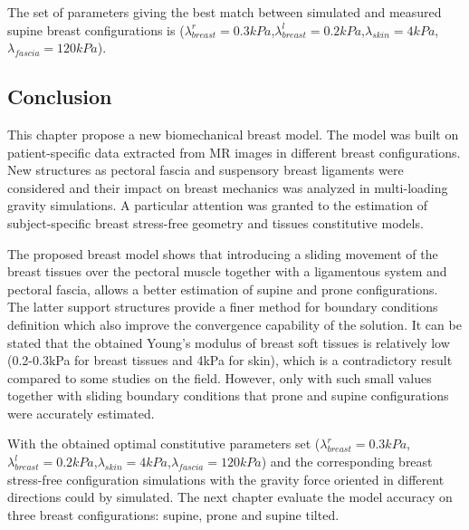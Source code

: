 The set of parameters giving the best match between simulated and measured supine breast configurations is ($\lambda_{breast}^r=0.3 kPa$,$\lambda_{breast}^l=0.2 kPa$,$\lambda_{skin}=4 kPa$,$\lambda_{fascia}=120 kPa$).  


\subsection{Conclusion}


This chapter propose a new biomechanical breast model. The model was built on patient-specific data extracted from MR images in different breast configurations. New structures as pectoral fascia and suspensory breast ligaments were considered and their impact on breast mechanics was analyzed in multi-loading gravity simulations.  A particular attention was granted to the estimation of subject-specific breast stress-free geometry and tissues constitutive models.
 
The proposed breast model shows that introducing a sliding movement of the breast tissues over the pectoral muscle together with a ligamentous system and pectoral fascia, allows a better estimation of supine and prone configurations. The latter support structures provide a finer method for boundary conditions definition which also improve the convergence capability of the solution. It can be stated that the obtained Young’s modulus of breast soft tissues is relatively low (0.2-0.3kPa for breast tissues and 4kPa for skin), which is a contradictory result compared to some studies on the field. However, only with such small values together with sliding boundary conditions that prone and supine configurations were accurately estimated.

With the obtained optimal constitutive parameters set ($\lambda_{breast}^r=0.3 kPa$,$\lambda_{breast}^l=0.2 kPa$,$\lambda_{skin}=4 kPa$,$\lambda_{fascia}=120 kPa$) and the corresponding  breast stress-free configuration simulations with the gravity force oriented in different directions could by simulated. The next chapter evaluate the model accuracy on three breast configurations: supine, prone and supine tilted.
   




